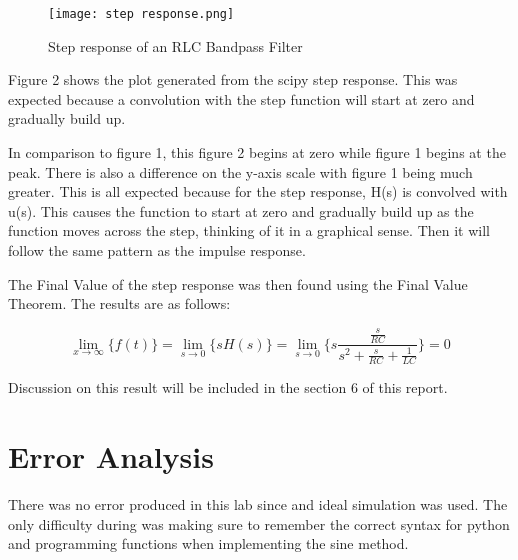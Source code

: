 \documentclass[12pt, titlepage]{article}
\begin{document}
        \clearpage
        \begin{figure}[h!]
            \centering
            \texttt{[image: step response.png]}
            \caption{Step response of an RLC Bandpass Filter}
            \label{fig:my_label}
        \end{figure}
        
        Figure 2 shows the plot generated from the scipy step response.  This was expected because a convolution with the step function will start at zero and gradually build up.
        
        In comparison to figure 1, this figure 2 begins at zero while figure 1 begins at the peak. There is also a difference on the y-axis scale with figure 1 being much greater.  This is all expected because for the step response, H(s) is convolved with u(s).  This causes the function to start at zero and gradually build up as the function moves across the step, thinking of it in a graphical sense. Then it will follow the same pattern as the impulse response.
        
        
        The Final Value of the step response was then found using the Final Value Theorem.  The results are as follows:
        
        \begin{equation}
            \lim_{x\to \infty}\{f(t)\} =  \lim_{s\to 0}\{sH(s)\}=\lim_{s\to 0}\{s\frac{\frac{s}{RC}}{s^2+\frac{s}{RC}+\frac{1}{LC}}\}=0
        \end{equation}
        
        Discussion on this result will be included in the section 6 of this report.
        
        \section{Error Analysis}
        There was no error produced in this lab since and ideal simulation was used.  The only difficulty during was making sure to remember the correct syntax for python and programming functions when implementing the sine method.
\end{document}
